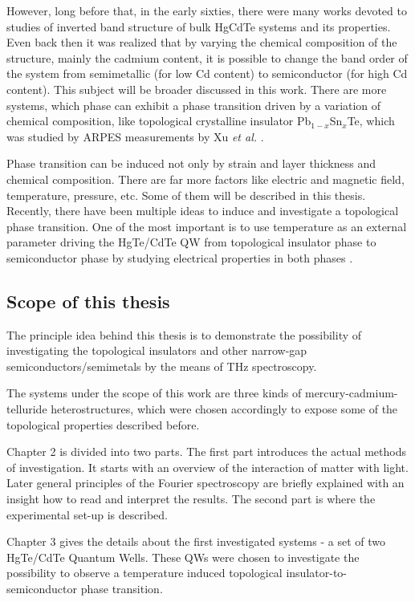 \documentclass[titlepage,a4paper]{book}
\newcommand{\wciecie}{\quad\phantom{v}}
\begin{document}
However, long before that, in the early sixties, there were many works devoted to studies of inverted band structure of bulk HgCdTe systems and its properties. Even back then it was realized that by varying the chemical composition of the structure, mainly the cadmium content, it is possible to change the band order of the system from semimetallic (for low Cd content) to semiconductor (for high Cd content). This subject will be broader discussed in this work. There are more systems, which phase can exhibit a phase transition driven by a variation of chemical composition, like topological crystalline insulator Pb$_{1-x}$Sn$_{x}$Te, which was studied by ARPES measurements by Xu \textit{et al.} \cite{Xu_CTI}.

Phase transition can be induced not only by strain and layer thickness and chemical composition. There are far more factors like electric and magnetic field, temperature, pressure, etc. Some of them will be described in this thesis. Recently, there have been multiple ideas to induce and investigate a topological phase transition. One of the most important is to use temperature as an external parameter driving the HgTe/CdTe QW from topological insulator phase to semiconductor phase by studying electrical properties in both phases \cite{Wiedmann_State}. 

\subsection{Scope of this thesis}
\wciecie
The principle idea behind this thesis is to demonstrate the possibility of investigating the topological insulators and other narrow-gap semiconductors/semimetals by the means of THz spectroscopy. 

The systems under the scope of this work are three kinds of mercury-cadmium-telluride heterostructures, which were chosen accordingly to expose some of the topological properties described before.

Chapter 2 is divided into two parts. The first part introduces the actual methods of investigation. It starts with an overview of the interaction of matter with light. Later general principles of the Fourier spectroscopy are briefly explained with an insight how to read and interpret the results. The second part is where the experimental set-up is described. 

Chapter 3 gives the details about the first investigated systems - a set of two HgTe/CdTe Quantum Wells. These QWs were chosen to investigate the possibility to observe a temperature induced topological insulator-to-semiconductor phase transition.
\end{document}
